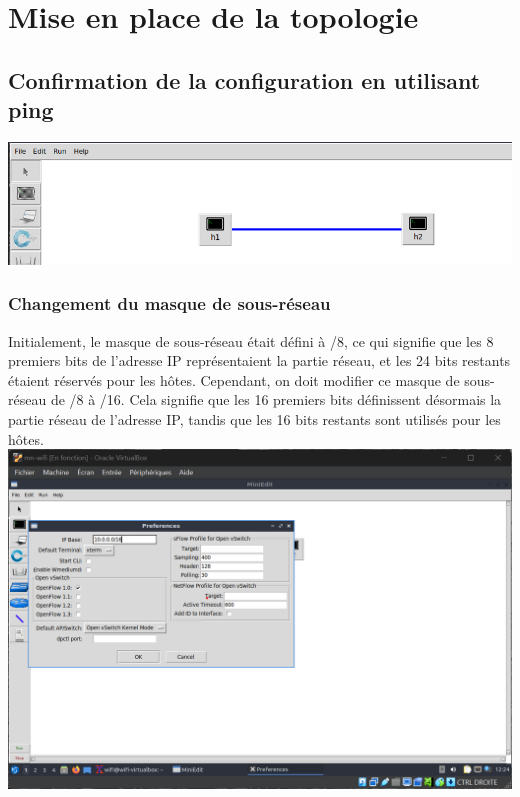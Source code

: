 \section*{Mise en place de la topologie} 
\vspace{0.3cm}

\subsection{Confirmation de la configuration en utilisant ping}
\includegraphics[width=1\textwidth]{./images/topology.png} \\
\subsubsection{Changement du masque de sous-réseau}
\vspace{0.3cm}
Initialement, le masque de sous-réseau était défini à /8, ce qui signifie que les 8 premiers bits de l'adresse IP représentaient la partie réseau, et les 24 bits restants étaient réservés pour les hôtes.
Cependant, on doit modifier ce masque de sous-réseau de /8 à /16. Cela signifie que les 16 premiers bits définissent désormais la partie réseau de l’adresse IP, tandis que les 16 bits restants sont utilisés pour les hôtes.\\

\includegraphics[width=1\textwidth]{./images/IpBaseSetup.png} \\


